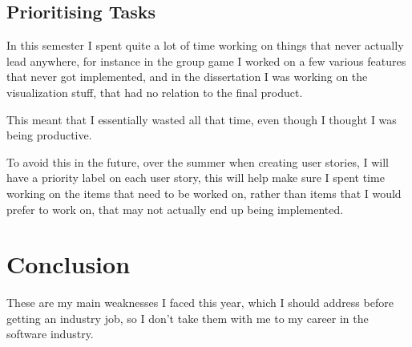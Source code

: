 \documentclass{scrartcl}
\begin{document}
%
\subsection{Prioritising Tasks}

In this semester I spent quite a lot of time working on things that never actually lead anywhere, for instance in the group game I worked on a few various features that never got implemented, and in the dissertation I was working on the visualization stuff, that had no relation to the final product.

This meant that I essentially wasted all that time, even though I thought I was being productive.

\par


To avoid this in the future, over the summer when creating user stories, I will have a priority label on each user story, this will help make sure I spent time working on the items that need to be worked on, rather than items that I would prefer to work on, that may not actually end up being implemented.


\section{Conclusion}
These are my main weaknesses I faced this year, which I should address before getting an industry job, so I don't take them with me to my career in the software industry.


%



\end{document}
